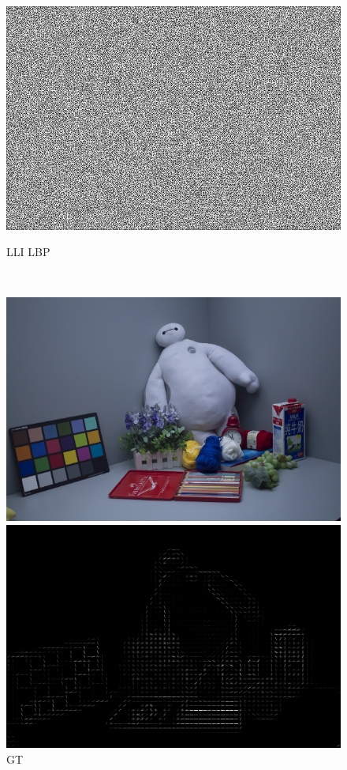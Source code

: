 \documentclass[CJK,aspectratio=169]{beamer}  %
\begin{document}
\begin{frame}
\begin{figure}
\begin{minipage}{.3\textwidth}
				\includegraphics[width=\linewidth]{picture/LLIE/My Architecture/Edge Detection/low00269_lbp}	
				\caption*{\small LLI LBP}
			\end{minipage} \\
			\vspace{-0.3cm}
			\begin{minipage}{.3\textwidth}
				\centering
				\includegraphics[width=\linewidth]{picture/LLIE/My Architecture/Edge Detection/normal00269}
				\caption*{\small GT}
			\end{minipage}
			\begin{minipage}{.3\textwidth}
				\centering
				\includegraphics[width=\linewidth]{picture/LLIE/My Architecture/Edge Detection/normal00269_hog}

\end{minipage}
\end{figure}
\end{frame}
\end{document}
